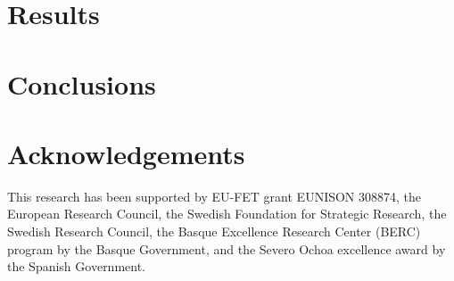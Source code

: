 \documentclass[a4paper]{elsarticle}
\begin{document}
  \section{Results} \label{sec:Results}
  

  \section{Conclusions} \label{sec:Conclusions}
  

  \section*{Acknowledgements}
  This research has been supported by EU-FET grant EUNISON 308874, the European
  Research Council, the Swedish Foundation for Strategic Research, the Swedish
  Research Council, the Basque Excellence Research Center (BERC) program by
  the Basque Government, and the Severo Ochoa excellence award by the Spanish
  Government.

  \printbibliography
\end{document}
